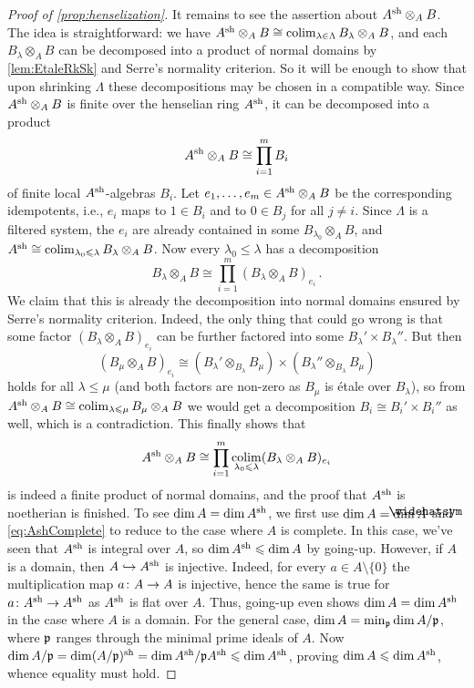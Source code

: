 \begin{proof}[Proof of \cref{prop:henselization}]
	It remains to see the assertion about $A^{\mathrm{sh}}\otimes_AB$. The idea is straightforward: we have $A^{\mathrm{sh}}\otimes_AB\cong \operatorname*{colim}_{\lambda\in\Lambda} B_\lambda\otimes_AB$, and each $B_\lambda\otimes_AB$ can be decomposed into a product of normal domains by \cref{lem:EtaleRkSk} and Serre's normality criterion. So it will be enough to show that upon shrinking $\Lambda$ these decompositions may be chosen in a compatible way. Since $A^{\mathrm{sh}}\otimes_AB$ is finite over the henselian ring $A^{\mathrm{sh}}$, it can be decomposed into a product 
	\begin{equation*}
		A^{\mathrm{sh}}\otimes_AB\cong \prod_{i=1}^mB_i
	\end{equation*}
	of finite local $A^{\mathrm{sh}}$-algebras $B_i$. Let $e_1,\dotsc,e_m\in A^{\mathrm{sh}}\otimes_AB$ be the corresponding idempotents, i.e., $e_i$ maps to $1\in B_i$ and to $0\in B_j$ for all $j\neq i$. Since $\Lambda$ is a filtered system, the $e_i$ are already contained in some $B_{\lambda_0}\otimes_AB$, and $A^{\mathrm{sh}}\cong \operatorname*{colim}_{\lambda_0\leqslant\lambda}B_\lambda\otimes_AB$. Now every $\lambda_0\leq \lambda$ has a decomposition
	\begin{equation*}
		B_\lambda\otimes_AB\cong \prod_{i=1}^m(B_\lambda\otimes_AB)_{e_i}\,.
	\end{equation*}
	We claim that this is already the decomposition into normal domains ensured by Serre's normality criterion. Indeed, the only thing that could go wrong is that some factor $(B_\lambda\otimes_AB)_{e_i}$ can be further factored into some $B_\lambda'\times B_\lambda''$. But then
	\begin{equation*}
		(B_\mu\otimes_AB)_{e_i}\cong (B_\lambda'\otimes_{B_\lambda}B_\mu)\times (B_\lambda''\otimes_{B_\lambda}B_\mu)
	\end{equation*}
	holds for all $\lambda\leq \mu$ (and both factors are non-zero as $B_\mu$ is étale over $B_\lambda$), so from $A^{\mathrm{sh}}\otimes_AB\cong \operatorname*{colim}_{\lambda\leqslant \mu}B_\mu\otimes_AB$ we would get a decomposition $B_i\cong B_i'\times B_i''$ as well, which is a contradiction. This finally shows that 
	\begin{equation*}
		A^{\mathrm{sh}}\otimes_AB\cong \prod_{i=1}^m\operatorname*{colim}_{\lambda_0\leqslant\lambda}(B_\lambda\otimes_AB)_{e_i}
	\end{equation*}
	is indeed a finite product of normal domains, and the proof that $A^{\mathrm{sh}}$ is noetherian is finished. To see $\dim A=\dim A^{\mathrm{sh}}$, we first use $\dim A=\dim \roof{A}$ and \cref{eq:AshComplete} to reduce to the case where $A$ is complete. In this case, we've seen that $A^{\mathrm{sh}}$ is integral over $A$, so $\dim A^{\mathrm{sh}}\leqslant \dim A$ by going-up. However, if $A$ is a domain, then $A\monomorphism A^\sh$ is injective. Indeed, for every $a\in A\setminus\{0\}$ the multiplication map $a\colon A\morphism A$ is injective, hence the same is true for $a\colon A^\sh\morphism A^\sh$ as $A^{\mathrm{sh}}$ is flat over $A$. Thus, going-up even shows $\dim A=\dim A^{\mathrm{sh}}$ in the case where $A$ is a domain. For the general case, $\dim A=\min_{\mathfrak{p}}\dim A/\mathfrak{p}$, where $\mathfrak{p}$ ranges through the minimal prime ideals of $A$. Now $\dim A/\mathfrak{p}=\dim (A/\mathfrak{p})^{\mathrm{sh}}=\dim A^{\mathrm{sh}}/\mathfrak{p} A^{\mathrm{sh}}\leqslant \dim A^{\mathrm{sh}}$, proving $\dim A\leqslant \dim A^{\mathrm{sh}}$, whence equality must hold.
	

\end{proof}
